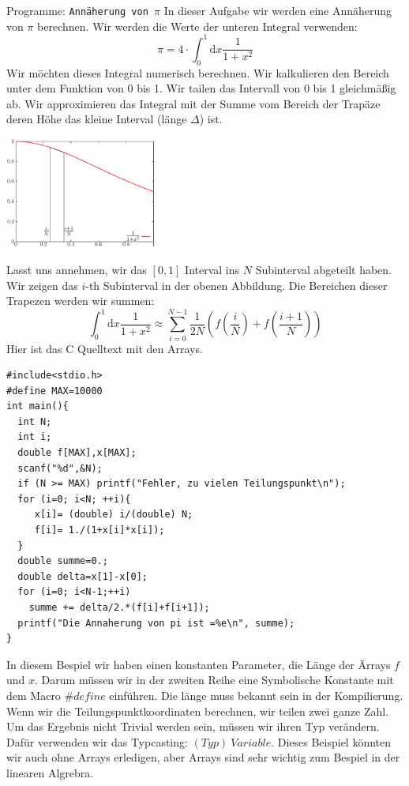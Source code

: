 \begin{myexampleprogram}{ Programme: \texttt{Annäherung von $\pi$}}
In dieser Aufgabe wir werden eine Annäherung von $\pi$ berechnen. 
Wir werden die Werte der unteren Integral verwenden:
\begin{equation}
\pi=4\cdot \int_{0}^{1} \mathrm{d}x \dfrac{1}{1+x^2}
\end{equation}
Wir möchten dieses Integral numerisch berechnen. Wir kalkulieren den Bereich unter
dem Funktion von 0 bis 1. Wir tailen das Intervall von 0 bis 1 gleichmäßig ab. Wir 
approximieren das Integral mit der Summe vom Bereich der Trapäze deren 
Höhe das kleine Interval (länge $\Delta$) ist.
\vspace{-2cm}
\begin{center}
\includegraphics[width=5cm]{trapez1.ps}
\end{center}
\vspace{-2.5cm}
Lasst uns annehmen, wir das $[0,1]$ Interval ins $N$ Subinterval abgeteilt haben. Wir zeigen
das $i$-th Subinterval in der obenen Abbildung. Die Bereichen dieser Trapezen werden
wir summen:
\begin{equation}
 \int_{0}^{1} \mathrm{d}x \dfrac{1}{1+x^2}\approx \sum_{i=0}^{N-1}\frac{1}{2N}(f(\frac{i}{N})+f(\frac{i+1}{N}))
\end{equation}
Hier ist das C Quelltext mit den Arrays.
\begin{lstlisting}
#include<stdio.h>
#define MAX=10000
int main(){
  int N;
  int i;
  double f[MAX],x[MAX];
  scanf("%d",&N);
  if (N >= MAX) printf("Fehler, zu vielen Teilungspunkt\n");
  for (i=0; i<N; ++i){
     x[i]= (double) i/(double) N;
     f[i]= 1./(1+x[i]*x[i]);
  }
  double summe=0.;
  double delta=x[1]-x[0];
  for (i=0; i<N-1;++i)
    summe += delta/2.*(f[i]+f[i+1]);
  printf("Die Annaherung von pi ist =%e\n", summe);
}
\end{lstlisting}
In diesem Bespiel wir haben einen konstanten Parameter, die Länge der Ärrays $f$ und $x$.
Darum müssen wir in der zweiten Reihe eine Symbolische Konstante mit dem Macro $\#define$ einführen.
Die länge muss bekannt sein in der Kompilierung. Wenn wir die Teilungspunktkoordinaten berechnen, wir 
teilen zwei ganze Zahl. Um das Ergebnis nicht Trivial werden sein, müssen wir ihren Typ verändern. Dafür 
verwenden wir das Typcasting: $(Typ)~Variable$. Dieses Beispiel könnten wir auch ohne Arrays erledigen, 
aber Arrays sind sehr wichtig zum Bespiel in der linearen Algrebra.
\end{myexampleprogram}

